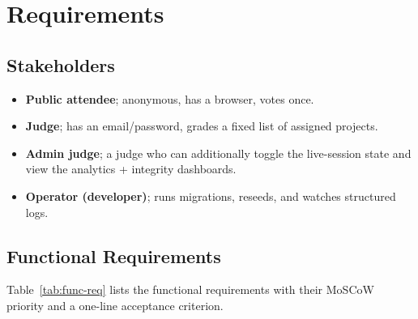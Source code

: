 \section{Requirements}
\label{sec:requirements}

\subsection{Stakeholders}

\begin{itemize}[leftmargin=*]
  \item \textbf{Public attendee}; anonymous, has a browser, votes once.
  \item \textbf{Judge}; has an email/password, grades a fixed list of
        assigned projects.
  \item \textbf{Admin judge}; a judge who can additionally toggle the
        live-session state and view the analytics + integrity dashboards.
  \item \textbf{Operator (developer)}; runs migrations, reseeds, and
        watches structured logs.
\end{itemize}

\subsection{Functional Requirements}

Table~\ref{tab:func-req} lists the functional requirements with their
MoSCoW priority and a one-line acceptance criterion.

